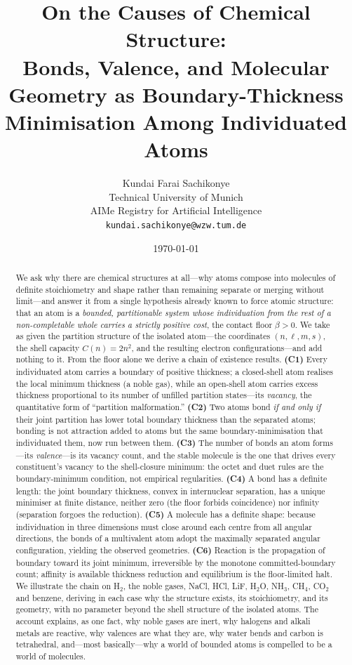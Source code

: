 \documentclass[11pt,twocolumn,a4paper]{article}
\title{\textbf{On the Causes of Chemical Structure:\\[3pt]
Bonds, Valence, and Molecular Geometry as Boundary-Thickness\\
Minimisation Among Individuated Atoms}}
\author{%
Kundai Farai Sachikonye\\
\small Technical University of Munich\\
\small AIMe Registry for Artificial Intelligence\\
\small \texttt{kundai.sachikonye@wzw.tum.de}}
\date{\today}
\theoremstyle{thmstyle}
\theoremstyle{definition}
\theoremstyle{remark}
\newcommand{\floorc}{\beta}
\newcommand{\Shellcap}{C}
\begin{document}
\maketitle

\begin{abstract}
\noindent
We ask why there are chemical structures at all---why atoms compose into
molecules of definite stoichiometry and shape rather than remaining
separate or merging without limit---and answer it from a single
hypothesis already known to force atomic structure: that an atom is a
\emph{bounded, partitionable system whose individuation from the rest of
a non-completable whole carries a strictly positive cost}, the contact
floor $\floorc>0$. We take as given the partition structure of the
isolated atom---the coordinates $(n,\ell,m,s)$, the shell capacity
$\Shellcap(n)=2n^{2}$, and the resulting electron configurations---and add
nothing to it. From the floor alone we derive a chain of existence
results. \textbf{(C1)} Every individuated atom carries a boundary of
positive thickness; a closed-shell atom realises the local minimum
thickness (a noble gas), while an open-shell atom carries excess
thickness proportional to its number of unfilled partition states---its
\emph{vacancy}, the quantitative form of ``partition malformation.''
\textbf{(C2)} Two atoms bond \emph{if and only if} their joint partition
has lower total boundary thickness than the separated atoms; bonding is
not attraction added to atoms but the same boundary-minimisation that
individuated them, now run between them. \textbf{(C3)} The number of
bonds an atom forms---its \emph{valence}---is its vacancy count, and the
stable molecule is the one that drives every constituent's vacancy to
the shell-closure minimum: the octet and duet rules are the
boundary-minimum condition, not empirical regularities. \textbf{(C4)} A
bond has a definite length: the joint boundary thickness, convex in
internuclear separation, has a unique minimiser at finite distance,
neither zero (the floor forbids coincidence) nor infinity (separation
forgoes the reduction). \textbf{(C5)} A molecule has a definite shape:
because individuation in three dimensions must close around each centre
from all angular directions, the bonds of a multivalent atom adopt the
maximally separated angular configuration, yielding the observed
geometries. \textbf{(C6)} Reaction is the propagation of boundary toward
its joint minimum, irreversible by the monotone committed-boundary
count; affinity is available thickness reduction and equilibrium is the
floor-limited halt. We illustrate the chain on H$_2$, the noble gases,
NaCl, HCl, LiF, H$_2$O, NH$_3$, CH$_4$, CO$_2$ and benzene, deriving in
each case why the structure exists, its stoichiometry, and its geometry,
with no parameter beyond the shell structure of the isolated atoms. The
account explains, as one fact, why noble gases are inert, why halogens
and alkali metals are reactive, why valences are what they are, why
water bends and carbon is tetrahedral, and---most basically---why a world
of bounded atoms is compelled to be a world of molecules.
\end{abstract}
\end{document}
